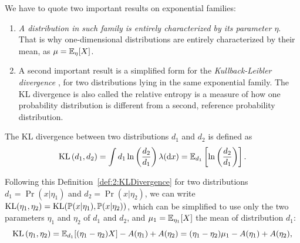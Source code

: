We have to quote two important results on exponential families:

\begin{enumerate}
    \item
    \emph{A distribution in such family is entirely characterized by its parameter $\eta$}.
    That is why one-dimensional distributions are entirely characterized by their mean, as $\mu = \mathbb{E}_{\eta}[X]$.

    \item
    A second important result is a simplified form for the \emph{Kullback-Leibler divergence} \cite{KullbackLeibler51}, for two distributions lying in the same exponential family.
    The KL divergence is also called the relative entropy is a measure of how one probability distribution is different from a second, reference probability distribution.
\end{enumerate}

\begin{defn}\label{def:2:KLDivergence}
    The KL divergence between two distributions $d_1$ and $d_2$ is defined as
    \begin{equation}\label{eq:2:Kullback-LeiblerDivergenceExpFamily1}
        \mathrm{KL}\left(d_1, d_2\right) = \int d_1 \ln\left(\frac{d_2}{d_1}\right) \lambda(\mathrm{d}x) = \mathbb{E}_{d_1} \left[ \ln\left(\frac{d_2}{d_1}\right) \right].
    \end{equation}
\end{defn}

Following this Definition~\ref{def:2:KLDivergence} for two distributions
$d_1=\Pr(x|\eta_1)$ and $d_2=\Pr(x|\eta_2)$,
we can write $\mathrm{KL}( \eta_1, \eta_2 ) = \mathrm{KL}(\mathbb{P}(x|\eta_1), \mathbb{P}(x|\eta_2))$, which can be simplified to use only the two parameters $\eta_1$ and $\eta_2$ of $d_1$ and $d_2$,
and $\mu_1 = \mathbb{E}_{\eta_1}[X]$ the mean of distribution $d_1$:
%
\begin{equation}\label{eq:2:Kullback-LeiblerDivergenceExpFamily2}
    \mathrm{KL}\left( \eta_1, \eta_2 \right) = \mathbb{E}_{d_1}[ (\eta_1 - \eta_2) X ] - A(\eta_1) + A(\eta_2) = (\eta_1 - \eta_2) \mu_1 - A(\eta_1) + A(\eta_2),
\end{equation}


